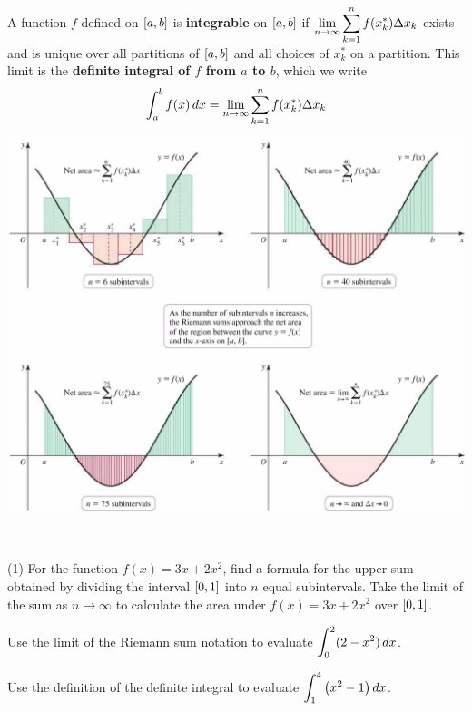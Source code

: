 \documentclass[mathNotesPreamble]{subfiles}
\begin{document}
\begin{defn*}
  A function $f$ defined on ${\left[a,b\right]}$ is \textbf{integrable} on ${\left[a,b\right]}$ if $\displaystyle\lim_{n\to \infty} \sum_{k=1}^n f(x_k^*)\Delta x_k$ exists and is unique over all partitions of ${\left[a,b\right]}$ and all choices of $x_k^*$ on a partition. This limit is the \textbf{definite integral of $f$ from $a$ to $b$}, which we write
  \[\int_a^b f(x)\,dx=\lim_{n\to \infty}\sum_{k=1}^n f(x_k^*)\Delta x_k\]
\end{defn*}

\begin{center}
  \includegraphics[width=0.85\linewidth]{images/briggs_05_02/fig5_20.png}
\end{center}
\pagebreak
\begin{ex*}~

  \begin{tasks}[after-item-skip=\stretch{1}](1)
    \task 
      For the function $f(x)=3x+2x^2$, find a formula for the upper sum obtained by dividing the interval ${\left[0,1\right]}$ into $n$ equal subintervals.
    \task 
      Take the limit of the sum as $n\to\infty$ to calculate the area under $f(x)=3x+2x^2$ over ${\left[0,1\right]}$.
  \end{tasks}
\end{ex*}
\pagebreak

\begin{ex*}
  Use the limit of the Riemann sum notation to evaluate $\displaystyle\int_0^2 (2-x^2)\,dx$.
\end{ex*}
\begin{ex*}
  Use the definition of the definite integral to evaluate $\displaystyle\int_1^4 {\left(x^2-1\right)}\,dx$.
\end{ex*}
\pagebreak
\end{document}
